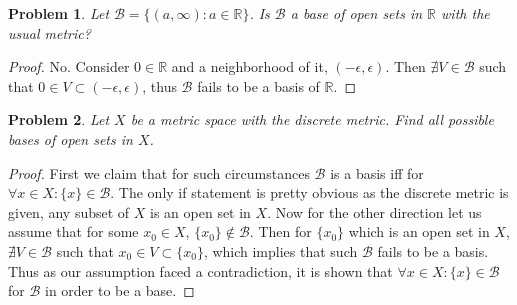 \documentclass[paper=a4, fontsize=11pt]{scrartcl}
\newtheorem{problem}{Problem}
\begin{document}
\begin{problem}
	Let $\mathcal{B} = \{ (a,\infty) : a \in \mathbb{R} \}$. Is $\mathcal{B}$ a base of open sets in $\mathbb{R}$ with the usual metric?
\end{problem}

\begin{proof}
No. Consider $0 \in \mathbb{R}$ and a neighborhood of it, $(-\epsilon,\epsilon)$. Then $\nexists V \in \mathcal{B}$ such that $0 \in V \subset (-\epsilon,\epsilon)$, thus $\mathcal{B}$ fails to be a basis of $\mathbb{R}$.
\end{proof}

\begin{problem}
	Let $X$ be a metric space with the discrete metric. Find all possible bases of open sets in $X$.
\end{problem}

\begin{proof}
	First we claim that for such circumstances $\mathcal{B}$ is a basis iff for $\forall x \in X : \{x\} \in \mathcal{B}$. The only if statement is pretty obvious as the discrete metric is given, any subset of $X$ is an open set in $X$. Now for the other direction let us assume that for some $x_0 \in X$, $\{x_0\} \notin \mathcal{B}$. Then for $\{x_0\}$ which is an open set in $X$, $\nexists V \in \mathcal{B}$ such that $x_0 \in V \subset \{x_0\}$, which implies that such $\mathcal{B}$ fails to be a basis. Thus as our assumption faced a contradiction, it is shown that $\forall x \in X : \{x\} \in \mathcal{B}$ for $\mathcal{B}$ in order to be a base.
\end{proof}
\end{document}
